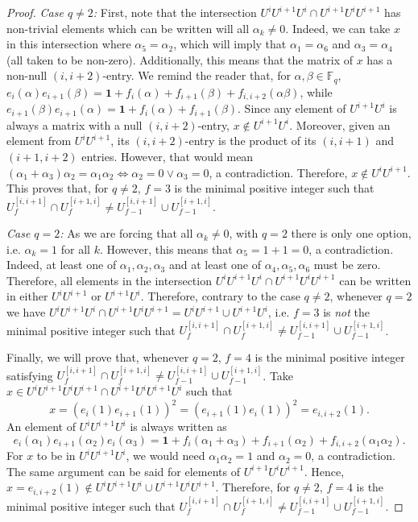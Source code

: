\documentclass[10pt,a4paper]{amsart}
\newcommand{\FF}{\mathbb{F}}
\begin{document}
\begin{proof}
    \textit{Case $q\neq 2$:} First, note that the intersection $U^iU^{i+1}U^i\cap U^{i+1}U^{i}U^{i+1}$ has non-trivial elements which can be written will all $\alpha_k\neq 0$. Indeed, we can take $x$ in this intersection where $\alpha_5=\alpha_2$, which will imply that $\alpha_1=\alpha_6$ and $\alpha_3=\alpha_4$ (all taken to be non-zero).
    Additionally, this means that the matrix of $x$ has a non-null $(i,i+2)$-entry. We remind the reader that, for $\alpha,\beta\in\FF_q$, $e_{i}(\alpha)e_{i+1}(\beta) = \mathbf{1} + f_i(\alpha)+f_{i+1}(\beta)+f_{i,i+2}(\alpha\beta)$, while $e_{i+1}(\beta)e_{i+1}(\alpha) = \mathbf{1} + f_i(\alpha)+f_{i+1}(\beta)$. Since
    any element of $U^{i+1}U^i$ is always a matrix with a null $(i,i+2)$-entry, $x\notin U^{i+1}U^i$. Moreover, given an element from $U^{i}U^{i+1}$, its $(i,i+2)$-entry is the product of its $(i,i+1)$ and $(i+1,i+2)$ entries. However, that would mean $(\alpha_1+\alpha_3)\alpha_2 = \alpha_1\alpha_2 \Leftrightarrow \alpha_2 = 0 \vee \alpha_3 = 0$, a contradiction. Therefore, $x\notin U^{i}U^{i+1}$.
    This proves that, for $q\neq 2$, $f=3$ is the minimal positive integer such that 
    $U^{[i,i+1]}_f\cap U^{[i+1,i]}_f\neq U^{[i,i+1]}_{f-1}\cup U^{[i+1,i]}_{f-1}$.
    
    \textit{Case $q=2$:} As we are forcing that all $\alpha_k\neq 0$, with $q=2$ there is only one option, i.e. $\alpha_k=1$ for all $k$. However, this means that $\alpha_5 = 1 + 1 = 0$, a contradiction. Indeed, at least one of ${\alpha_1,\alpha_2,\alpha_3}$ and at least one of ${\alpha_4,\alpha_5,\alpha_6}$ must be zero.
    Therefore, all elements in the intersection $U^iU^{i+1}U^i\cap U^{i+1}U^{i}U^{i+1}$ can be written in either $U^iU^{i+1}$ or $U^{i+1}U^{i}$.
    Therefore, contrary to the case $q\neq 2$, whenever $q=2$ we have $ U^iU^{i+1}U^i\cap U^{i+1}U^{i}U^{i+1}= U^iU^{i+1}\cup U^{i+1}U^i$, i.e. $f=3$ is \emph{not} the minimal positive integer such that $U^{[i,i+1]}_f\cap U^{[i+1,i]}_f\neq U^{[i,i+1]}_{f-1}\cup U^{[i+1,i]}_{f-1}$. 

    Finally, we will prove that, whenever $q=2$, $f=4$ is the minimal positive integer satisfying $U^{[i,i+1]}_f\cap U^{[i+1,i]}_f\neq U^{[i,i+1]}_{f-1}\cup U^{[i+1,i]}_{f-1}$. Take $x\in U^iU^{i+1}U^iU^{i+1}\cap U^{i+1}U^{i}U^{i+1}U^i$  such that $$x=(e_i(1)e_{i+1}(1))^2 = (e_{i+1}(1)e_i(1))^2=e_{i,i+2}(1).$$
    An element of $U^iU^{i+1}U^i$ is always written as $$e_i(\alpha_1)e_{i+1}(\alpha_2)e_{i}(\alpha_3)=\mathbf{1}+f_i(\alpha_1+\alpha_3)+f_{i+1}(\alpha_2)+f_{i,i+2}(\alpha_1\alpha_2).$$
    For $x$ to be in $U^iU^{i+1}U^i$, we would need $\alpha_1\alpha_2=1$ and $\alpha_2=0$, a contradiction. The same argument can be said for elements of $U^{i+1}U^iU^{i+1}$. Hence, $x=e_{i,i+2}(1)\notin U^iU^{i+1}U^i\cup U^{i+1}U^iU^{i+1}$. Therefore, for $q\neq 2$, $f=4$ is the minimal positive integer such that 
    $U^{[i,i+1]}_f\cap U^{[i+1,i]}_f\neq U^{[i,i+1]}_{f-1}\cup U^{[i+1,i]}_{f-1}$.
\end{proof}
\end{document}
